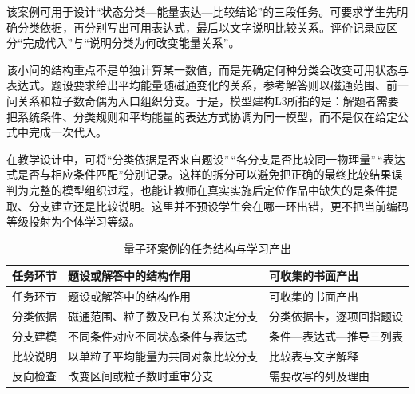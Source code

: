 \documentclass[
  12pt,
  a4paper]{ctexbook}
\begin{document}
该案例可用于设计``状态分类---能量表达---比较结论''的三段任务。可要求学生先明确分类依据，再分别写出可用表达式，最后以文字说明比较关系。评价记录应区分``完成代入''与``说明分类为何改变能量关系''。

该小问的结构重点不是单独计算某一数值，而是先确定何种分类会改变可用状态与表达式。题设要求给出平均能量随磁通变化的关系，参考解答则以磁通范围、前一问关系和粒子数奇偶为入口组织分支。于是，模型建构L3所指的是：解题者需要把系统条件、分类规则和平均能量的表达方式协调为同一模型，而不是仅在给定公式中完成一次代入。

在教学设计中，可将``分类依据是否来自题设''\,``各分支是否比较同一物理量''\,``表达式是否与相应条件匹配''分别记录。这样的拆分可以避免把正确的最终比较结果误判为完整的模型组织过程，也能让教师在真实实施后定位作品中缺失的是条件提取、分支建立还是比较说明。这里并不预设学生会在哪一环出错，更不把当前编码等级投射为个体学习等级。

\begin{longtable}[]{@{}
  >{\raggedright\arraybackslash}p{}
  >{\raggedright\arraybackslash}p{}
  >{\raggedright\arraybackslash}p{}@{}}
\caption{量子环案例的任务结构与学习产出}\tabularnewline
\toprule\noalign{}
\rowcolor{ThesisPale}
\begin{minipage}[b]{\linewidth}\raggedright
任务环节
\end{minipage} & \begin{minipage}[b]{\linewidth}\raggedright
题设或解答中的结构作用
\end{minipage} & \begin{minipage}[b]{\linewidth}\raggedright
可收集的书面产出
\end{minipage} \\
\midrule\noalign{}
\endfirsthead
\toprule\noalign{}
\rowcolor{ThesisPale}
\begin{minipage}[b]{\linewidth}\raggedright
任务环节
\end{minipage} & \begin{minipage}[b]{\linewidth}\raggedright
题设或解答中的结构作用
\end{minipage} & \begin{minipage}[b]{\linewidth}\raggedright
可收集的书面产出
\end{minipage} \\
\midrule\noalign{}
\endhead
\bottomrule\noalign{}
\endlastfoot
分类依据 & 磁通范围、粒子数及已有关系决定分支 &
分类依据卡，逐项回指题设 \\
分支建模 & 不同条件对应不同状态条件与表达式 &
条件---表达式---推导三列表 \\
比较说明 & 以单粒子平均能量为共同对象比较分支 & 比较表与文字解释 \\
反向检查 & 改变区间或粒子数时重审分支 & 需要改写的列及理由 \\
\end{longtable}
\end{document}
